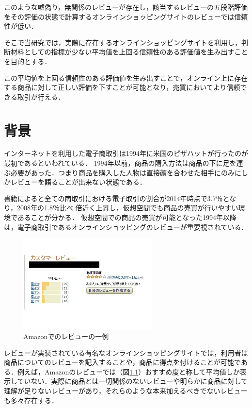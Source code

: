 このような嘘偽り，無関係のレビューが存在し，該当するレビューの五段階評価をその評価の状態で計算するオンラインショッピングサイトのレビューでは信頼性が低い．

そこで当研究では，実際に存在するオンラインショッピングサイトを利用し，判断材料としての指標が少ない平均値を上回る信頼性のある評価値を生み出すことを目的とする．

この平均値を上回る信頼性のある評価値を生み出すことで，オンライン上に存在する商品に対して正しい評価を下すことが可能となり，売買においてより信頼できる取引が行える．



\chapter{背景}

インターネットを利用した電子商取引は1994年に米国のピザハットが行ったのが最初であるといわれている\cite{sugasaka2003}．
1994年以前，商品の購入方法は商品の下に足を運ぶ必要があった．つまり商品を購入した人物は直接顔を合わせた相手にのみにしかレビューを語ることが出来ない状態である．

書籍によると全ての商取引における電子取引の割合が2014年時点で3.7％となり，2008年の1.8％比べ 倍近く上昇し，仮想空間でも商品の売買が行いやすい環境であることが分かる\cite{keizai2014}．
仮想空間での商品の売買が可能となった1994年以降は，電子商取引であるオンラインショッピングのレビューが重要視されている．



\begin{figure}[htbp]

\centering
\includegraphics[width=7cm,clip]{customerReview.pdf}
\caption{Amazonでのレビューの一例}
\label{customerReview}

\end{figure}

レビューが実装されている有名なオンラインショッピングサイトでは，利用者は商品についてのレビューを記入することや，商品に得点を付けることが可能である．例えば，Amazonのレビューでは（図\ref{customerReview}）おすすめ度と称して平均値しか表示していない．実際に商品とは一切関係のないレビューや明らかに商品に対して理解が足りないレビューがあり，それらのような本来加えるべきでないレビューも多々存在する．

